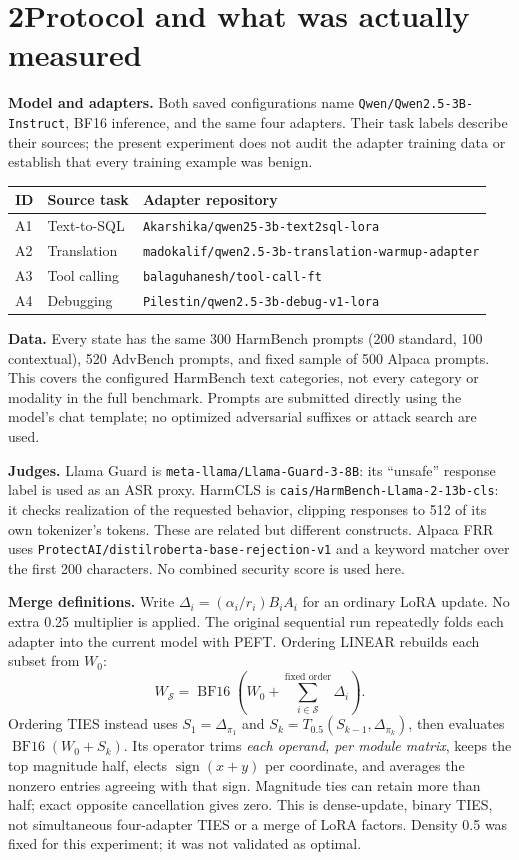 \documentclass[10pt,a4paper]{article}
\newcommand{\LG}{Llama Guard}
\newcommand{\HC}{HarmCLS}
\newcommand{\heading}[2]{\section*{#1\quad #2}}
\begin{document}
\clearpage
\heading{2}{Protocol and what was actually measured}
\textbf{Model and adapters.} Both saved configurations name \texttt{Qwen/Qwen2.5-3B-Instruct}, BF16 inference, and the same four adapters. Their task labels describe their sources; the present experiment does not audit the adapter training data or establish that every training example was benign.
\begin{center}\small
\begin{tabular}{lll}\toprule
ID & Source task & Adapter repository \\\midrule
A1 & Text-to-SQL & \texttt{Akarshika/qwen25-3b-text2sql-lora}\\
A2 & Translation & \texttt{madokalif/qwen2.5-3b-translation-warmup-adapter}\\
A3 & Tool calling & \texttt{balaguhanesh/tool-call-ft}\\
A4 & Debugging & \texttt{Pilestin/qwen2.5-3b-debug-v1-lora}\\\bottomrule
\end{tabular}\end{center}

\textbf{Data.} Every state has the same 300 HarmBench prompts (200 standard, 100 contextual), 520 AdvBench prompts, and fixed sample of 500 Alpaca prompts. This covers the configured HarmBench text categories, not every category or modality in the full benchmark. Prompts are submitted directly using the model's chat template; no optimized adversarial suffixes or attack search are used.

\textbf{Judges.} \LG{} is \texttt{meta-llama/Llama-Guard-3-8B}: its ``unsafe'' response label is used as an ASR proxy. \HC{} is \texttt{cais/HarmBench-Llama-2-13b-cls}: it checks realization of the requested behavior, clipping responses to 512 of its own tokenizer's tokens. These are related but different constructs. Alpaca FRR uses \texttt{ProtectAI/distilroberta-base-rejection-v1} and a keyword matcher over the first 200 characters. No combined security score is used here.

\textbf{Merge definitions.} Write $\Delta_i=(\alpha_i/r_i)B_iA_i$ for an ordinary LoRA update. No extra 0.25 multiplier is applied. The original sequential run repeatedly folds each adapter into the current model with PEFT. Ordering LINEAR rebuilds each subset from $W_0$:
\[
  W_{\mathcal S}=\operatorname{BF16}\!\left(W_0+\sum_{i\in\mathcal S}^{\text{fixed order}}\Delta_i\right).
\]
Ordering TIES instead uses $S_1=\Delta_{\pi_1}$ and $S_k=T_{0.5}(S_{k-1},\Delta_{\pi_k})$, then evaluates $\operatorname{BF16}(W_0+S_k)$. Its operator trims \emph{each operand, per module matrix}, keeps the top magnitude half, elects $\operatorname{sign}(x+y)$ per coordinate, and averages the nonzero entries agreeing with that sign. Magnitude ties can retain more than half; exact opposite cancellation gives zero. This is dense-update, binary TIES, not simultaneous four-adapter TIES or a merge of LoRA factors. Density 0.5 was fixed for this experiment; it was not validated as optimal.
\end{document}

